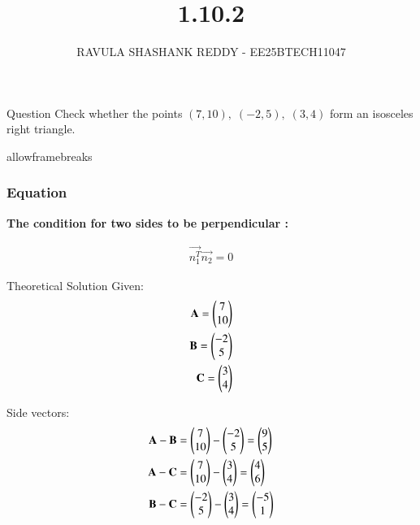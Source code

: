\documentclass{beamer}
\title %
{1.10.2}
\author %
{RAVULA SHASHANK REDDY - EE25BTECH11047}
\begin{document}
	
	
	\frame{\titlepage}
	\begin{frame}{Question}
		Check whether the points \( (7,10),\; (-2,5),\; (3,4) \) form an isosceles right triangle.\\

	\end{frame}
	\begin{frame}{allowframebreaks}
		\frametitle{Equation}
	\textbf{The condition for two sides to be perpendicular : }
		\centering
		
		\label{tab:parameters}
		\begin{align*}
			\vec{n_1^T}\vec{n_2}=0
		\end{align*}
		\end{frame}	
	
	\begin{frame}{Theoretical Solution}
Given:
\begin{align}
\mathbf{A} = \begin{pmatrix}7 \\ 10\end{pmatrix} \\
\mathbf{B} = \begin{pmatrix}-2 \\ 5\end{pmatrix} \\
\mathbf{C} = \begin{pmatrix}3 \\ 4\end{pmatrix}
\end{align}

Side vectors:
\begin{align}
\mathbf{A}-\mathbf{B} &= \begin{pmatrix}7 \\ 10\end{pmatrix} - \begin{pmatrix}-2 \\ 5\end{pmatrix} = \begin{pmatrix}9 \\ 5\end{pmatrix} \\
\mathbf{A}-\mathbf{C} &= \begin{pmatrix}7 \\ 10\end{pmatrix} - \begin{pmatrix}3 \\ 4\end{pmatrix} = \begin{pmatrix}4 \\ 6\end{pmatrix} \\
\mathbf{B}-\mathbf{C} &= \begin{pmatrix}-2 \\ 5\end{pmatrix} - \begin{pmatrix}3 \\ 4\end{pmatrix} = \begin{pmatrix}-5 \\ 1\end{pmatrix}
\end{align}
\end{frame}
\end{document}
